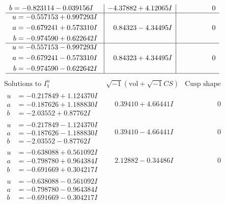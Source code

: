 \documentclass[1p]{elsarticle_modified}
\theoremstyle{definition}
\newcommand{\I}{\sqrt{-1}}
\begin{document}
$$\begin{array}{c|c|c}
\begin{aligned}
b &= -0.823114 - 0.039156 I\end{aligned}
 & -4.37882 + 4.12065 I & \phantom{-0.000000 } 0 \\ \hline\begin{aligned}
u &= -0.557153 + 0.997293 I \\
a &= -0.679241 + 0.573310 I \\
b &= -0.974590 + 0.622642 I\end{aligned}
 & \phantom{-}0.84323 - 4.34495 I & \phantom{-0.000000 } 0 \\ \hline\begin{aligned}
u &= -0.557153 - 0.997293 I \\
a &= -0.679241 - 0.573310 I \\
b &= -0.974590 - 0.622642 I\end{aligned}
 & \phantom{-}0.84323 + 4.34495 I & \phantom{-0.000000 } 0\\
 \hline 
 \end{array}$$\newpage$$\begin{array}{c|c|c}  
\text{Solutions to }I^u_{1}& \I (\text{vol} + \sqrt{-1}CS) & \text{Cusp shape}\\
 \hline 
\begin{aligned}
u &= -0.217849 + 1.124370 I \\
a &= -0.187626 + 1.188830 I \\
b &= -2.03552 + 0.87762 I\end{aligned}
 & \phantom{-}0.39410 + 4.66441 I & \phantom{-0.000000 } 0 \\ \hline\begin{aligned}
u &= -0.217849 - 1.124370 I \\
a &= -0.187626 - 1.188830 I \\
b &= -2.03552 - 0.87762 I\end{aligned}
 & \phantom{-}0.39410 - 4.66441 I & \phantom{-0.000000 } 0 \\ \hline\begin{aligned}
u &= -0.638088 + 0.561092 I \\
a &= -0.798780 + 0.964384 I \\
b &= -0.691669 + 0.304217 I\end{aligned}
 & \phantom{-}2.12882 - 0.34486 I & \phantom{-0.000000 } 0 \\ \hline\begin{aligned}
u &= -0.638088 - 0.561092 I \\
a &= -0.798780 - 0.964384 I \\
b &= -0.691669 - 0.304217 I\end{aligned}

\end{array}$$
\end{document}
